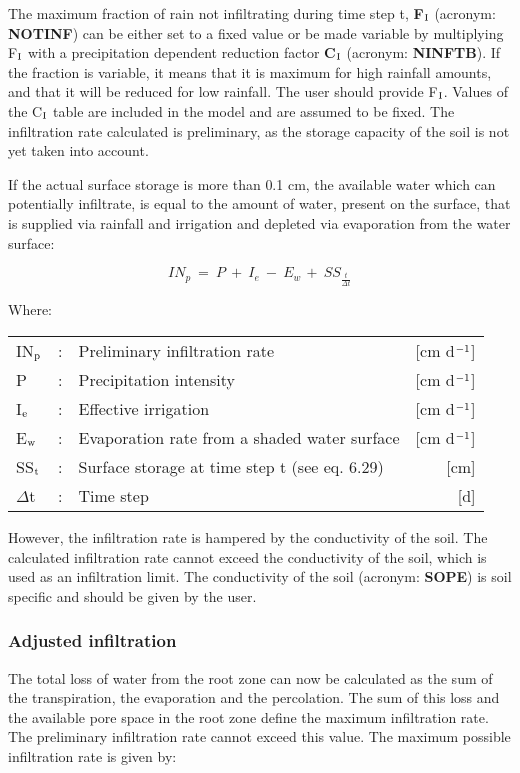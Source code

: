 The maximum fraction of rain not infiltrating during time step t, {\bf F$_{{\rm I}}$} 
(acronym: {\bf NOTINF})
can be either set to a fixed value or be made variable by multiplying F$_{{\rm I}}$ 
with a precipitation dependent reduction factor {\bf C$_{{\rm I}}$} (acronym: {\bf NINFTB}). 
If the fraction is variable, it means that it is maximum for high rainfall amounts, and 
that it will be reduced for low rainfall. The user should provide F$_{{\rm I}}$. 
Values of the C$_{{\rm I}}$ table are included in the model and
are assumed to be fixed. The infiltration rate calculated is preliminary, as the storage
capacity of the soil is not yet taken into account. 

If the actual surface storage is more than 0.1 cm, the available water which can 
potentially infiltrate, is equal to the amount of water, present on the surface, that is supplied via
rainfall and irrigation and depleted via evaporation from the water surface:

\begin{equation}
\label{eq:6.27}
IN_{p} ~=~P~+~I _{e} ~-~ E _{w~} +~ SS _{\frac{t}{\Delta t}} 
\end{equation}

Where:\\[5pt]
\begin{tabularx}{\textwidth}{llXr}
IN$_{{\rm p}}$ &:& Preliminary infiltration rate  & [cm d$^{{\rm -1}}$]\\
P &:& Precipitation intensity  & [cm d$^{{\rm -1}}$]\\
I$_{{\rm e}}$ &:& Effective irrigation  & [cm d$^{{\rm -1}}$]\\
E$_{{\rm w}}$ &:& Evaporation rate from a shaded water surface  & [cm d$^{{\rm -1}}$]\\
SS$_{{\rm t}}$ &:& Surface storage at time step t (see eq. 6.29)  & [cm]\\
$\Delta$t &:& Time step  & [d]\\
\end{tabularx}
 
However, the infiltration rate is hampered by the conductivity of the soil. The calculated
infiltration rate cannot exceed the conductivity of the soil, which is used as an infiltration
limit. The conductivity of the soil (acronym: {\bf SOPE}) is soil specific and should be given
by the user.

\subsubsection{Adjusted infiltration}
The total loss of water from the root zone can now be calculated as the sum of the
transpiration, the evaporation and the percolation. The sum of this loss and the available
pore space in the root zone define the maximum infiltration rate. The preliminary
infiltration rate cannot exceed this value. The maximum possible infiltration rate is given
by:

